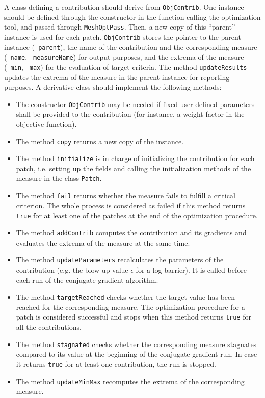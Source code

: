 \documentclass[12pt,a4paper,a4wide]{article}
\begin{document}
A class defining a contribution should derive from \texttt{ObjContrib}.
One instance should be defined through the constructor in the function
calling the optimization tool, and passed through \texttt{MeshOptPass}.
Then, a new copy of this ``parent'' instance is used for each patch.
\texttt{ObjContrib} stores the pointer to the parent instance
(\texttt{\_parent}), the name of the contribution and the corresponding
measure (\texttt{\_name}, \texttt{\_measureName}) for output purposes, and
the extrema of the measure (\texttt{\_min}, \texttt{\_max}) for the
evaluation of target criteria. The method \texttt{updateResults} updates
the extrema of the measure in the parent instance for reporting purposes.
A derivative class should implement the following methods:

\begin{itemize}
\item The constructor \texttt{ObjContrib} may be needed if fixed
user-defined parameters shall be provided to the contribution (for
instance, a weight factor in the objective function).
\item The method \texttt{copy} returns a new copy of the instance.
\item The method \texttt{initialize} is in charge of initializing
the contribution for each patch, i.e. setting up the fields and
calling the initialization methods of the measure in the class
\texttt{Patch}.
\item The method \texttt{fail} returns whether the measure fails
to fulfill a critical criterion. The whole process is considered
as failed if this method returns \texttt{true} for at least one
of the patches at the end of the optimization procedure.
\item The method \texttt{addContrib} computes the contribution
and its gradients and evaluates the extrema of the measure at
the same time.
\item The method \texttt{updateParameters} recalculates the
parameters of the contribution (e.g. the blow-up value $\epsilon$
for a log barrier). It is called before each run of the
conjugate gradient algorithm.
\item The method \texttt{targetReached} checks whether the target
value has been reached for the corresponding measure. The
optimization procedure for a patch is considered successful
and stops when this method returns \texttt{true} for all the
contributions.
\item The method \texttt{stagnated} checks whether the corresponding
measure stagnates compared to its value at the beginning of the
conjugate gradient run. In case it returns \texttt{true} for at least
one contribution, the run is stopped.
\item The method \texttt{updateMinMax} recomputes the extrema of
the corresponding measure.
\end{itemize}
\end{document}
